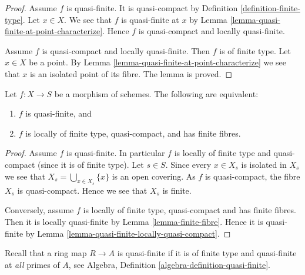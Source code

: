 \begin{proof}
Assume $f$ is quasi-finite. It is quasi-compact by Definition
\ref{definition-finite-type}. Let $x \in X$.
We see that $f$ is quasi-finite at $x$ by
Lemma \ref{lemma-quasi-finite-at-point-characterize}.
Hence $f$ is quasi-compact and locally quasi-finite.

\medskip\noindent
Assume $f$ is quasi-compact and locally quasi-finite.
Then $f$ is of finite type. Let $x \in X$ be a point.
By Lemma \ref{lemma-quasi-finite-at-point-characterize}
we see that $x$ is an isolated point of its fibre.
The lemma is proved.
\end{proof}

\begin{lemma}
\label{lemma-quasi-finite}
Let $f : X \to S$ be a morphism of schemes.
The following are equivalent:
\begin{enumerate}
\item $f$ is quasi-finite, and
\item $f$ is locally of finite type, quasi-compact, and has finite fibres.
\end{enumerate}
\end{lemma}

\begin{proof}
Assume $f$ is quasi-finite. In particular $f$ is locally of finite type
and quasi-compact (since it is of finite type). Let $s \in S$. Since
every $x \in X_s$ is isolated in $X_s$ we see that
$X_s = \bigcup_{x \in X_s} \{x\}$ is an open covering. As $f$
is quasi-compact, the fibre $X_s$ is quasi-compact. Hence we see
that $X_s$ is finite.

\medskip\noindent
Conversely, assume $f$ is locally of finite type, quasi-compact
and has finite fibres. Then it is locally quasi-finite by
Lemma \ref{lemma-finite-fibre}. Hence it is quasi-finite by
Lemma \ref{lemma-quasi-finite-locally-quasi-compact}.
\end{proof}

\noindent
Recall that a ring map $R \to A$ is quasi-finite if it is
of finite type and quasi-finite at {\it all} primes of $A$, see
Algebra, Definition \ref{algebra-definition-quasi-finite}.

